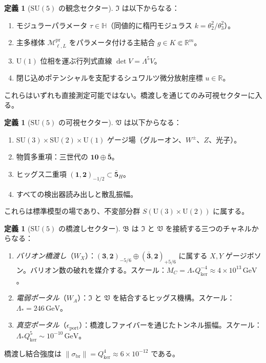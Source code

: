 \documentclass[12pt]{article}
\theoremstyle{plain}
\theoremstyle{definition}
\newtheorem{definition}[theorem]{定義}
\numberwithin{equation}{section}
\newcommand{\R}{\mathbb{R}}
\newcommand{\HH}{\mathbb{H}}
\newcommand{\fI}{\mathfrak{I}}
\newcommand{\fV}{\mathfrak{V}}
\newcommand{\fB}{\mathfrak{B}}
\newcommand{\pr}{\mathrm{pr}}
\newcommand{\br}{\mathrm{br}}
\newcommand{\kker}{\mathrm{ker}}
\begin{document}
\begin{definition}[$\mathrm{SU}(5)$ の観念セクター]
$\fI$ は以下からなる：
\begin{enumerate}[label=(\roman*)]
\item モジュラーパラメータ $\tau\in\HH$（同値的に楕円モジュラス $k=\theta_2^2/\theta_3^2$）。
\item 主多様体 $\mathcal{M}^{\pr}_{\ell,L}$ をパラメータ付ける主結合 $g\in K\Subset\R^m$。
\item $\mathrm{U}(1)$ 位相を運ぶ行列式直線 $\det V=\Lambda^5 V$。
\item 閉じ込めポテンシャルを支配するシュワルツ微分放射座標 $u\in\R$。
\end{enumerate}
これらはいずれも直接測定可能ではない。橋渡しを通じてのみ可視セクターに入る。
\end{definition}

\begin{definition}[$\mathrm{SU}(5)$ の可視セクター]
$\fV$ は以下からなる：
\begin{enumerate}[label=(\roman*)]
\item $\mathrm{SU}(3)\times\mathrm{SU}(2)\times\mathrm{U}(1)$ ゲージ場（グルーオン、$W^\pm$、$Z$、光子）。
\item 物質多重項：三世代の $\mathbf{10}\oplus\bar{\mathbf{5}}$。
\item ヒッグス二重項 $(\mathbf{1},\mathbf{2})_{-1/2}\subset\bar{\mathbf{5}}_H$。
\item すべての検出器読み出しと散乱振幅。
\end{enumerate}
これらは標準模型の場であり、不変部分群 $S(\mathrm{U}(3)\times\mathrm{U}(2))$ に属する。
\end{definition}

\begin{definition}[$\mathrm{SU}(5)$ の橋渡しセクター]
$\fB$ は $\fI$ と $\fV$ を接続する三つのチャネルからなる：
\begin{enumerate}[label=(\roman*)]
\item \emph{バリオン橋渡し}（$W_X$）：$(\mathbf{3},\mathbf{2})_{-5/6}\oplus(\bar{\mathbf{3}},\mathbf{2})_{+5/6}$ に属する $X,Y$ ゲージボソン。バリオン数の破れを媒介する。スケール：$M_C=\Lambda_* Q_{\kker}^{-4}\approx 4\times10^{13}\,\mathrm{GeV}$。
\item \emph{電弱ポータル}（$W_A$）：$\fI$ と $\fV$ を結合するヒッグス機構。スケール：$\Lambda_*=246\,\mathrm{GeV}$。
\item \emph{真空ポータル}（$\epsilon_{\mathrm{port}}$）：橋渡しファイバーを通じたトンネル振幅。スケール：$\Lambda_* Q_{\kker}^5\sim 10^{-10}\,\mathrm{GeV}$。
\end{enumerate}
橋渡し結合強度は $\|\sigma_{\br}\|=Q_{\kker}^4\approx 6\times10^{-12}$ である。
\end{definition}
\end{document}
